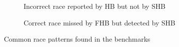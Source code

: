 
\begin{figure}[b]
\centering
\begin{subfigure}{.4\textwidth}
  \centering
  \vspace{0.4cm}
  \caption{Incorrect race reported by HB but not by SHB}
  \label{fig:pattern1}
\end{subfigure}%
\hspace{1cm}
\begin{subfigure}{.4\textwidth}
  \centering
  \vspace{0.15in}
  \caption{Correct race missed by FHB but detected by SHB}
  \label{fig:pattern2}
\end{subfigure}
\caption{Common race patterns found in the benchmarks}
\label{fig:patterns}
\end{figure}
